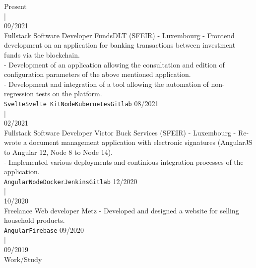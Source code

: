\documentclass[8pt]{cv} %
\begin{document}
\begin{entrylist}
	\entry
		{Present\vspace{0.6cm}\\\hspace*{0.6cm}|\vspace{0.6cm}\\ 09/2021\\\footnotesize{}}
		{Fullstack Software Developer}
		{FundsDLT (SFEIR) - Luxembourg}
		{- Frontend development on an application for banking transactions between investment funds via the blockchain. \\
		- Development of an application allowing the consultation and edition of configuration parameters of the above mentioned application.\\
        - Development and integration of a tool allowing the automation of non-regression tests on the platform.\\ 
        \texttt{Svelte}\slashsep\texttt{Svelte Kit}\slashsep\texttt{Node}\slashsep\texttt{Kubernetes}\slashsep\texttt{Gitlab}}
	\entry
		{08/2021\vspace{0.4cm}\\\hspace*{0.6cm}|\vspace{0.4cm}\\ 02/2021\\\footnotesize{}}
		{Fullstack Software Developer}
		{Victor Buck Services (SFEIR) - Luxembourg}
		{- Re-wrote a document management application with electronic signatures (AngularJS to Angular 12, Node 8 to Node 14).\\
		 - Implemented various deployments and continious integration processes of the application. \\
		\texttt{Angular}\slashsep\texttt{Node}\slashsep\texttt{Docker}\slashsep\texttt{Jenkins}\slashsep\texttt{Gitlab}}
	\entry
		{12/2020\vspace{0.1cm}\\\hspace*{0.6cm}|\vspace{0.1cm}\\ 10/2020\\\footnotesize{Freelance}}
		{Web developer}
		{Metz}
		{- Developed and designed a website for selling household products. \\
		\texttt{Angular}\slashsep\texttt{Firebase}}
	\entry
		{09/2020\vspace{0.6cm}\\\hspace*{0.6cm}|\vspace{0.6cm}\\ 09/2019\\\footnotesize{Work/Study}}

\end{entrylist}
\end{document}
